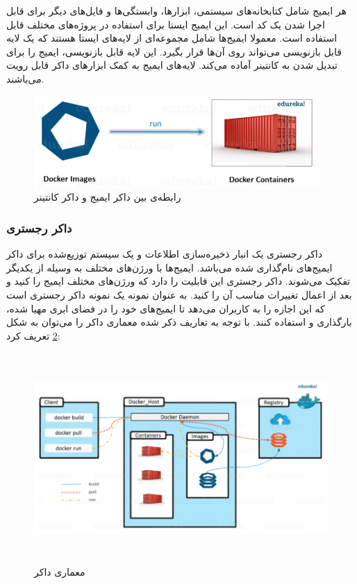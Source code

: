هر ایمیج شامل کتابخانه‌های سیستمی، ابزارها، وابستگی‌ها و فایل‌های دیگر برای قابل اجرا شدن یک کد است. این ایمیج ایستا برای استفاده در پروژه‌های مختلف قابل استفاده است. معمولا ایمیج‌ها شامل مجموعه‌ای از لایه‌های ایستا هستند که یک لایه قابل بازنویسی می‌تواند روی آن‌‌ها قرار بگیرد. این لایه قابل بازنویسی، ایمیج را برای تبدیل شدن به کانتینر آماده می‌کند. لایه‌های ایمیج به کمک ابزارهای داکر قابل رویت می‌باشند.

\begin{figure}[!h]
	\centering
	\includegraphics[height=3.5cm]{fig2-6}
	\caption{رابطه‌ی بین داکر ایمیج و داکر کانتینر}
	\label{تصویر 2-6}
\end{figure}


\subsubsection*{داکر رجستری}

داکر رجستری یک انبار ذخیره‌سازی اطلاعات و یک سیستم توزیع‌شده برای داکر ایمیج‌های نام‌گذاری شده می‌باشد. ایمیج‌ها با ورژن‌های مختلف به وسیله 
از یکدیگر تفکیک می‌شوند. داکر رجستری این قابلیت را دارد که ورژن‌های مختلف ایمیج را
کنید و بعد از اعمال تغییرات مناسب آن را 
کنید. به عنوان نمونه 
یک نمونه داکر رجستری است که این اجازه را به کاربران می‌دهد تا ایمیج‌های خود را در فضای ابری مهیا شده، بارگذاری و استفاده کنند.
\newline
\newline
با توجه به تعاریف ذکر شده معماری داکر را می‌توان به شکل 
\ref{تصویر 2-7}
تعریف کرد:
\begin{figure}[!h]
	\centering
	\includegraphics[height=8cm]{fig2-7}
	\caption{معماری داکر}
	\label{تصویر 2-7}
\end{figure}


